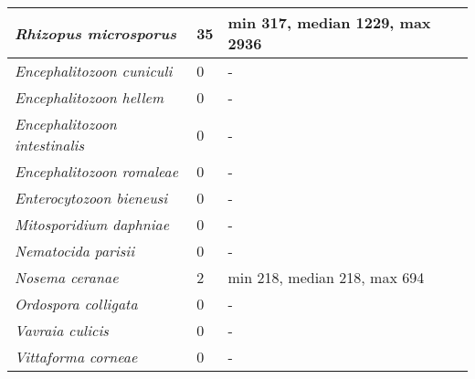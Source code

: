 {\begin{longtable}{| L{4cm} | L{2cm}  | L{5cm} | L{4cm} |}
\textit{Rhizopus microsporus} & 35 & min 317, median 1229, max 2936 & \\ \hline
\textit{Encephalitozoon cuniculi} & 0 & - & \\ \hline
\textit{Encephalitozoon hellem} & 0 & - & \\ \hline
\textit{Encephalitozoon intestinalis} & 0 & - & \\ \hline
\textit{Encephalitozoon romaleae} & 0 & - & \\ \hline
\textit{Enterocytozoon bieneusi} & 0 & - & \\ \hline
\textit{Mitosporidium daphniae} & 0 & - & \\ \hline
\textit{Nematocida parisii} & 0 & - & \\ \hline
\textit{Nosema ceranae} & 2 & min 218, median 218, max 694 & \\ \hline
\textit{Ordospora colligata} & 0 & - & \\ \hline
\textit{Vavraia culicis} & 0 & - & \\ \hline
\textit{Vittaforma corneae} & 0 & - & \\ \hline



\end{longtable}}
